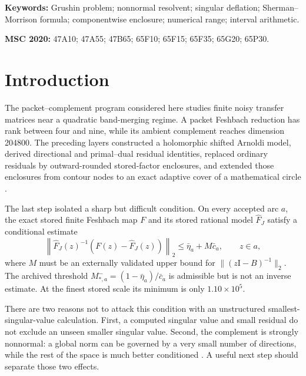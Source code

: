 \documentclass[11pt]{article}
\theoremstyle{definition}
\theoremstyle{remark}
\newcommand{\Id}{\mathrm I}
\newcommand{\norm}[1]{\left\lVert#1\right\rVert}
\begin{document}
\noindent\textbf{Keywords:} Grushin problem; nonnormal resolvent; singular
deflation; Sherman--Morrison formula; componentwise enclosure; numerical
range; interval arithmetic.

\medskip
\noindent\textbf{MSC 2020:} 47A10; 47A55; 47B65; 65F10; 65F15; 65F35;
65G20; 65P30.


\section{Introduction}
\label{sec:introduction}

The packet--complement program considered here studies finite noisy transfer
matrices near a quadratic band-merging regime.  A packet Feshbach reduction
has rank between four and nine, while its ambient complement reaches
dimension 204800.  The preceding layers constructed a holomorphic shifted
Arnoldi model, derived directional and primal--dual residual identities,
replaced ordinary residuals by outward-rounded stored-factor enclosures, and
extended those enclosures from contour nodes to an exact adaptive cover of a
mathematical circle
\citep{WangContourFeshbach2026,WangDirectionalRouche2026,WangPrimalDual2026,WangOutwardCode2026,WangArcwise2026}.

The last step isolated a sharp but difficult condition.  On every accepted
arc $a$, the exact stored finite Feshbach map $F$ and its stored rational
model $\widehat F_J$ satisfy a conditional estimate
\begin{equation}
 \norm{\widehat F_J(z)^{-1}(F(z)-\widehat F_J(z))}_2
 \leq \bar\eta_a+M\bar c_a,
 \qquad z\in a,
 \label{eq:rh28-gate}
\end{equation}
where $M$ must be an externally validated upper bound for
$\|(z\Id-B)^{-1}\|_2$.  The archived threshold
$M_{*,a}^-=(1-\bar\eta_a)/\bar c_a$ is admissible but is not an inverse
estimate.  At the finest stored scale its minimum is only
$1.10\times10^5$.

There are two reasons not to attack this condition with an unstructured
smallest-singular-value calculation.  First, a computed singular value and
small residual do not exclude an unseen smaller singular value.  Second,
the complement is strongly nonnormal: a global norm can be governed by a
very small number of directions, while the rest of the space is much better
conditioned \citep{TrefethenEmbree2005,StewartSun1990}.  A useful next step
should separate those two effects.
\end{document}
